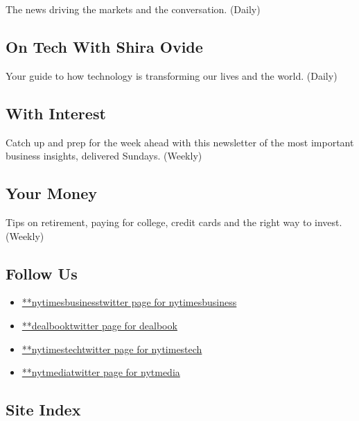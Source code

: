 The news driving the markets and the conversation. (Daily)

\hypertarget{on-tech-with-shira-ovide}{%
\subsection{On Tech With Shira Ovide}\label{on-tech-with-shira-ovide}}

Your guide to how technology is transforming our lives and the world.
(Daily)

\hypertarget{with-interest}{%
\subsection{With Interest}\label{with-interest}}

Catch up and prep for the week ahead with this newsletter of the most
important business insights, delivered Sundays. (Weekly)

\hypertarget{your-money}{%
\subsection{Your Money}\label{your-money}}

Tips on retirement, paying for college, credit cards and the right way
to invest. (Weekly)

\hypertarget{follow-us}{%
\subsection{Follow Us}\label{follow-us}}

\begin{itemize}
\tightlist
\item
  \href{https://twitter.com/nytimesbusiness}{**nytimesbusinesstwitter
  page for nytimesbusiness}
\item
  \href{https://twitter.com/dealbook}{**dealbooktwitter page for
  dealbook}
\item
  \href{https://twitter.com/nytimestech}{**nytimestechtwitter page for
  nytimestech}
\item
  \href{https://twitter.com/nytmedia}{**nytmediatwitter page for
  nytmedia}
\end{itemize}

\hypertarget{site-index}{%
\subsection{Site Index}\label{site-index}}

